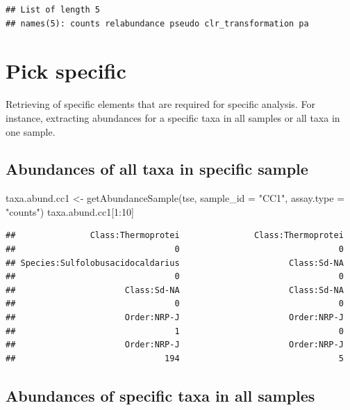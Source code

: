 \documentclass[
]{book}
\newenvironment{Shaded}{\begin{snugshade}}{\end{snugshade}}
\newcommand{\AttributeTok}[1]{\textcolor[rgb]{0.77,0.63,0.00}{#1}}
\newcommand{\DecValTok}[1]{\textcolor[rgb]{0.00,0.00,0.81}{#1}}
\newcommand{\FunctionTok}[1]{\textcolor[rgb]{0.00,0.00,0.00}{#1}}
\newcommand{\NormalTok}[1]{#1}
\newcommand{\OtherTok}[1]{\textcolor[rgb]{0.56,0.35,0.01}{#1}}
\newcommand{\SpecialCharTok}[1]{\textcolor[rgb]{0.00,0.00,0.00}{#1}}
\newcommand{\StringTok}[1]{\textcolor[rgb]{0.31,0.60,0.02}{#1}}
\begin{document}
\begin{verbatim}
## List of length 5
## names(5): counts relabundance pseudo clr_transformation pa
\end{verbatim}

\hypertarget{pick-specific}{%
\section{Pick specific}\label{pick-specific}}

Retrieving of specific elements that are required for specific analysis. For
instance, extracting abundances for a specific taxa in all samples or all taxa
in one sample.

\hypertarget{abundances-of-all-taxa-in-specific-sample}{%
\subsection{Abundances of all taxa in specific sample}\label{abundances-of-all-taxa-in-specific-sample}}

\begin{Shaded}
\begin{Highlighting}[]
\NormalTok{taxa.abund.cc1 }\OtherTok{\textless{}{-}} \FunctionTok{getAbundanceSample}\NormalTok{(tse, }
                                     \AttributeTok{sample\_id =} \StringTok{"CC1"}\NormalTok{,}
                                     \AttributeTok{assay.type =} \StringTok{"counts"}\NormalTok{)}
\NormalTok{taxa.abund.cc1[}\DecValTok{1}\SpecialCharTok{:}\DecValTok{10}\NormalTok{]}
\end{Highlighting}
\end{Shaded}

\begin{verbatim}
##               Class:Thermoprotei               Class:Thermoprotei 
##                                0                                0 
## Species:Sulfolobusacidocaldarius                      Class:Sd-NA 
##                                0                                0 
##                      Class:Sd-NA                      Class:Sd-NA 
##                                0                                0 
##                      Order:NRP-J                      Order:NRP-J 
##                                1                                0 
##                      Order:NRP-J                      Order:NRP-J 
##                              194                                5
\end{verbatim}

\hypertarget{abundances-of-specific-taxa-in-all-samples}{%
\subsection{Abundances of specific taxa in all samples}\label{abundances-of-specific-taxa-in-all-samples}}
\end{document}
